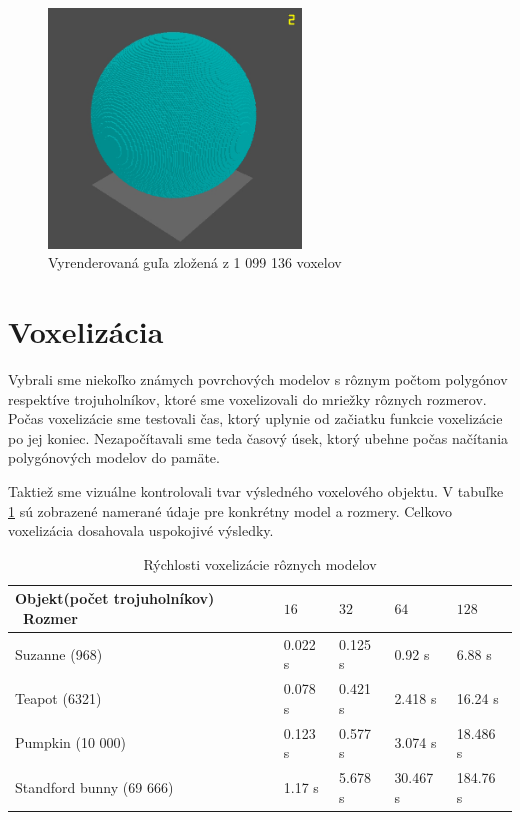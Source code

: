 \begin{figure}[ht!]
	\centering
	\includegraphics[width=0.6\textwidth]{ballRender.png}
	\caption[Vyrenderovaná guľa]{Vyrenderovaná guľa zložená z 1 099 136 voxelov}
	\label{ballRender}
\end{figure}


\section{Voxelizácia}
Vybrali sme niekoľko známych povrchových modelov s rôznym počtom polygónov respektíve trojuholníkov, ktoré sme voxelizovali do mriežky rôznych rozmerov. Počas voxelizácie sme testovali čas, ktorý uplynie od začiatku funkcie voxelizácie po jej koniec. Nezapočítavali sme teda časový úsek, ktorý ubehne počas načítania polygónových modelov do pamäte. 

Taktiež sme vizuálne kontrolovali tvar výsledného voxelového objektu. V tabuľke \ref{tab:voxelization} sú zobrazené namerané údaje pre konkrétny model a rozmery. Celkovo voxelizácia dosahovala uspokojivé výsledky.

\begin{table}[!h]
  \centering
  \begin{tabular}{|l|l|l|l|l|}
  \hline
  Objekt(počet trojuholníkov) \ Rozmer & 
  \begin{math}16\end{math} & 
  \begin{math}32\end{math} & 
  \begin{math}64\end{math} & 
  \begin{math}128\end{math} \\
  \hline
  Suzanne (968) & 0.022 s & 0.125 s & 0.92 s & 6.88 s\\
  \hline
  Teapot (6321) & 0.078 s & 0.421 s & 2.418 s & 16.24 s\\
  \hline
  Pumpkin (10 000) & 0.123 s & 0.577 s & 3.074 s & 18.486 s\\
  \hline
  Standford bunny (69 666) & 1.17 s & 5.678 s & 30.467 s & 184.76 s \\ 
  \hline
  \end{tabular}
  \caption{Rýchlosti voxelizácie rôznych modelov}
  \label{tab:voxelization}
\end{table}


